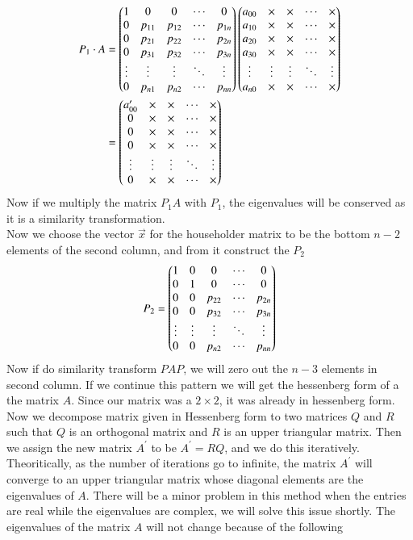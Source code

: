 \documentclass[journal]{IEEEtran}
\begin{document}
\begin{align}
P_1\cdot A &= \begin{pmatrix}
1 & 0 & 0 & \cdots & 0 \\
0 & p_{11} & p_{12} & \cdots & p_{1n} \\
0      & p_{21} & p_{22} & \cdots & p_{2n} \\
0      & p_{31} & p_{32} & \cdots & p_{3n} \\
\vdots & \vdots & \vdots & \ddots & \vdots \\
0      & p_{n1} & p_{n2} & \cdots & p_{nn}
\end{pmatrix}\begin{pmatrix}
a_{00} & \times & \times & \cdots & \times \\
a_{10} & \times & \times & \cdots & \times \\
a_{20} & \times & \times & \cdots & \times \\
a_{30} & \times & \times & \cdots & \times \\
\vdots & \vdots & \vdots & \ddots & \vdots \\
a_{n0} & \times & \times & \cdots & \times
\end{pmatrix}\\
&=\begin{pmatrix}
a_{00}^\prime & \times & \times & \cdots & \times \\
0 & \times & \times & \cdots & \times \\
0      & \times & \times & \cdots & \times \\
0      & \times   & \times & \cdots & \times \\
\vdots & \vdots & \vdots & \ddots & \vdots \\
0      & \times      & \times      & \cdots & \times
\end{pmatrix}
\end{align}
Now if we multiply the matrix $P_1A$ with $P_1$, the eigenvalues will be conserved as it is a similarity transformation.\\
Now we choose the vector $\vec{x}$ for the householder matrix to be the bottom $n-2$ elements of the second column, and from it construct the $P_2$
\begin{align}
P_2 = \begin{pmatrix}
1 & 0 & 0 & \cdots & 0 \\
0 & 1 & 0 & \cdots & 0 \\
0 & 0 & p_{22} & \cdots & p_{2n} \\
0 & 0 & p_{32} & \cdots & p_{3n} \\
\vdots & \vdots & \vdots & \ddots & \vdots \\
0 & 0 & p_{n2} & \cdots & p_{nn}
\end{pmatrix}
\end{align}
Now if do similarity transform $PAP$, we will zero out the $n-3$ elements in second column.
If we continue this pattern we will get the hessenberg form of a the matrix $A$. Since our matrix was a $2\times 2$, it was already in hessenberg form. Now we decompose matrix given in Hessenberg form to two matrices $Q$ and $R$ such that $Q$ is an orthogonal matrix and $R$ is an upper triangular matrix. Then we assign the new matrix $A^\prime$ to be $A^\prime = RQ$, and we do this iteratively. Theoritically, as the number of iterations go to infinite, the matrix $A^\prime$ will converge to an upper triangular matrix whose diagonal elements are the eigenvalues of $A$. There will be a minor problem in this method when the entries are real while the eigenvalues are complex, we will solve this issue shortly. The eigenvalues of the matrix $A$ will not change because of the following
\end{document}
